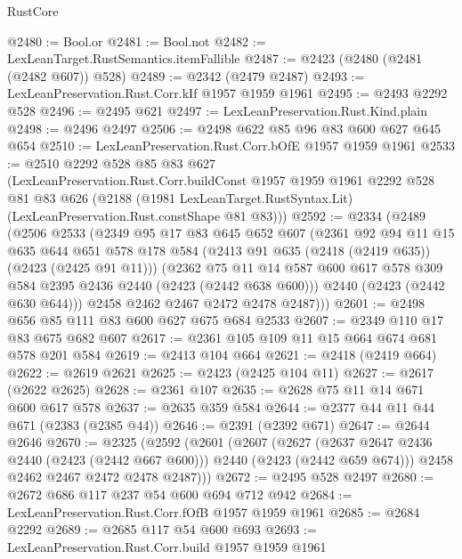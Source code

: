 \begin{lexlean}{RustCore}
\begin{coremodule}
@2480 := Bool.or
@2481 := Bool.not
@2482 := LexLeanTarget.RustSemantics.itemFallible
@2487 := @2423 (@2480 (@2481 (@2482 @607)) @528)
@2489 := @2342 (@2479 @2487)
@2493 := LexLeanPreservation.Rust.Corr.kIf @1957 @1959 @1961
@2495 := @2493 @2292 @528
@2496 := @2495 @621
@2497 := LexLeanPreservation.Rust.Kind.plain
@2498 := @2496 @2497
@2506 := @2498 @622 @85 @96 @83 @600 @627 @645 @654
@2510 := LexLeanPreservation.Rust.Corr.bOfE @1957 @1959 @1961
@2533 := @2510
    @2292
    @528
    @85
    @83
    @627
    (LexLeanPreservation.Rust.Corr.buildConst
      @1957
      @1959
      @1961
      @2292
      @528
      @81
      @83
      @626
      (@2188 (@1981 LexLeanTarget.RustSyntax.Lit) (LexLeanPreservation.Rust.constShape @81 @83)))
@2592 := @2334
    (@2489
      (@2506
        @2533
        (@2349
          @95
          @17
          @83
          @645
          @652
          @607
          (@2361
            @92
            @94
            @11
            @15
            @635
            @644
            @651
            @578
            @178
            @584
            (@2413 @91 @635 (@2418 (@2419 @635)) (@2423 (@2425 @91 @11)))
            (@2362
              @75
              @11
              @14
              @587
              @600
              @617
              @578
              @309
              @584
              @2395
              @2436
              @2440
              (@2423 (@2442 @638 @600)))
            @2440
            (@2423 (@2442 @630 @644)))
          @2458
          @2462
          @2467
          @2472
          @2478
          @2487)))
@2601 := @2498 @656 @85 @111 @83 @600 @627 @675 @684 @2533
@2607 := @2349 @110 @17 @83 @675 @682 @607
@2617 := @2361 @105 @109 @11 @15 @664 @674 @681 @578 @201 @584
@2619 := @2413 @104 @664
@2621 := @2418 (@2419 @664)
@2622 := @2619 @2621
@2625 := @2423 (@2425 @104 @11)
@2627 := @2617 (@2622 @2625)
@2628 := @2361 @107
@2635 := @2628 @75 @11 @14 @671 @600 @617 @578
@2637 := @2635 @359 @584
@2644 := @2377 @44 @11 @44 @671 (@2383 (@2385 @44))
@2646 := @2391 (@2392 @671)
@2647 := @2644 @2646
@2670 := @2325
    (@2592
      (@2601
        (@2607
          (@2627
            (@2637 @2647 @2436 @2440 (@2423 (@2442 @667 @600)))
            @2440
            (@2423 (@2442 @659 @674)))
          @2458
          @2462
          @2467
          @2472
          @2478
          @2487)))
@2672 := @2495 @528 @2497
@2680 := @2672 @686 @117 @237 @54 @600 @694 @712 @942
@2684 := LexLeanPreservation.Rust.Corr.fOfB @1957 @1959 @1961
@2685 := @2684 @2292
@2689 := @2685 @117 @54 @600 @693
@2693 := LexLeanPreservation.Rust.Corr.build @1957 @1959 @1961

\end{coremodule}
\end{lexlean}
